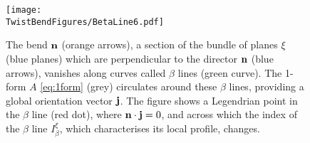 \begin{figure}[htbp]
    \centering
    \texttt{[image: \\TwistBendFigures/BetaLine6.pdf]}
    \caption[The structure of $\beta$ lines.]{The bend $\mathbf{n}$ (orange arrows), a section of the bundle of planes $\xi$ (blue planes) which are perpendicular to the director $\mathbf{n}$ (blue arrows), vanishes along curves called $\beta$ lines (green curve). The 1-form $A$ \eqref{eq:1form} (grey) circulates around these $\beta$ lines, providing a global orientation vector $\mathbf{j}$. The figure shows a Legendrian point in the $\beta$ line (red dot), where $\mathbf{n} \cdot \mathbf{j} =0$, and across which the index of the $\beta$ line $I_\beta^\xi$, which characterises its local profile, changes.}
    \label{fig:BetaLines}
\end{figure}

